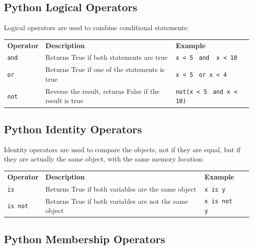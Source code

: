 \documentclass[12pt,a4paper]{article}
\newcommand{\lcode}[1]{%
	\lstinline{#1}%
}
\newcommand{\trcol}[3]{%
	#1 \quad  & #2 & #3 \\
}
\begin{document}
\subsection{Python Logical Operators}

Logical operators are used to combine conditional statements:

\begin{table}[h]
	\begin{center}
		\begin{tabularx}{\textwidth}{lXll}
\trcol{\bfseries Operator}{\bfseries Description}
			{\bfseries Example}
\trcol{\lcode{and}}{Returns True if both statements are true}
			{\lcode{x < 5}\hspace{2mm} \lcode{ and  x < 10}}
\trcol{\lcode{or}}{Returns True if one of the statements is true}
			{\lcode{x < 5}\hspace{2mm} \lcode{ or x < 4}}
\trcol{\lcode{not}}{Reverse the result, returns False if the result is true}
			{\lcode{not(x < 5}\hspace{2mm} \lcode{ and x < 10)}}
		\end{tabularx}
	\end{center}
\end{table}
\vfill\newpage
\subsection{Python Identity Operators}

Identity operators are used to compare the objects, not if they are equal, but
if they are actually the same object, with the same memory location:

\begin{table}[h]
	\begin{center}
		\begin{tabularx}{.9\textwidth}{lXll}
\trcol{\bfseries Operator}{\bfseries Description}
			{\bfseries Example}
\trcol{\lcode{is}}{Returns True if both variables are the same object}
			{\lcode{x is y}}
\trcol{\lcode{is not}}{Returns True if both variables are not the same object}
			{\lcode{x is not y}}
		\end{tabularx}
	\end{center}
\end{table}
\subsection{Python Membership Operators}
\end{document}

